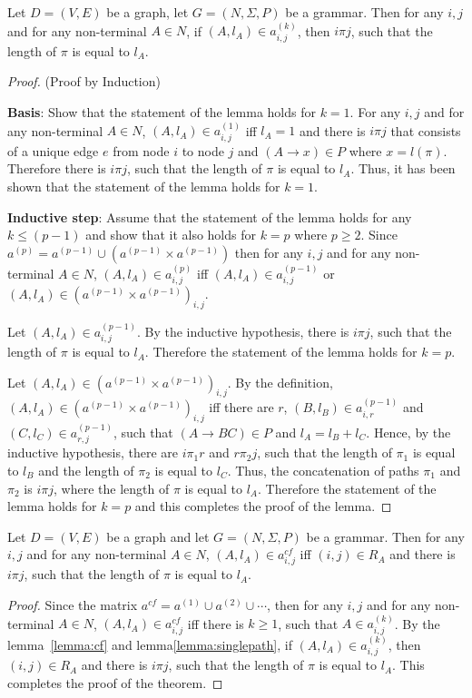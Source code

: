 \begin{lemma}\label{lemma:singlepath}
	Let $D = (V,E)$ be a graph, let $G =(N,\Sigma,P)$ be a grammar. Then for any $i, j$ and for any non-terminal $A \in N$, if $(A,l_A) \in a^{(k)}_{i,j}$, then $i \pi j$, such that the length of $\pi$ is equal to $l_A$.
\end{lemma}
\begin{proof}(Proof by Induction)
	
	\textbf{Basis}: Show that the statement of the lemma holds for $k = 1$. For any $i, j$ and for any non-terminal $A \in N$, $(A, l_A) \in a^{(1)}_{i,j}$ iff $l_A = 1$ and there is $i \pi j$ that consists of a unique edge $e$ from node $i$ to node $j$ and $(A \rightarrow x) \in P$ where $x = l(\pi)$. Therefore there is $i \pi j$, such that the length of $\pi$ is equal to $l_A$. Thus, it has been shown that the statement of the lemma holds for $k = 1$.
	
	\textbf{Inductive step}: Assume that the statement of the lemma holds for any $k \leq (p - 1)$ and show that it also holds for $k = p$ where $p \geq 2$. Since $a^{(p)} = a^{(p-1)} \cup (a^{(p-1)} \times a^{(p-1)})$ then for any $i, j$ and for any non-terminal $A \in N$, $(A, l_A) \in a^{(p)}_{i,j}$ iff $(A, l_A) \in a^{(p-1)}_{i,j}$ or $(A, l_A) \in (a^{(p-1)} \times a^{(p-1)})_{i,j}$.
	
	Let $(A, l_A) \in a^{(p-1)}_{i,j}$. By the inductive hypothesis, there is $i \pi j$, such that the length of $\pi$ is equal to $l_A$. Therefore the statement of the lemma holds for $k = p$.
	
	Let $(A, l_A) \in (a^{(p-1)} \times a^{(p-1)})_{i,j}$. By the definition, $(A, l_A) \in (a^{(p-1)} \times a^{(p-1)})_{i,j}$ iff there are $r$, $(B, l_B) \in a^{(p-1)}_{i,r}$ and $(C, l_C) \in a^{(p-1)}_{r,j}$, such that $(A \rightarrow B C) \in P$ and $l_A = l_B + l_C$. Hence, by the inductive hypothesis, there are $i \pi_1 r$ and $r \pi_2 j$, such that the length of $\pi_1$ is equal to $l_B$ and the length of $\pi_2$ is equal to $l_C$. Thus, the concatenation of paths $\pi_1$ and $\pi_2$ is $i \pi j$, where the length of $\pi$ is equal to $l_A$. Therefore the statement of the lemma holds for $k = p$ and this completes the proof of the lemma.
\end{proof}

\begin{mytheorem}\label{thm:singlepathcorrect}
	Let $D = (V,E)$ be a graph and let $G =(N,\Sigma,P)$ be a grammar. Then for any $i, j$ and for any non-terminal $A \in N$, $(A, l_A) \in a^{cf}_{i,j}$ iff $(i,j) \in R_A$ and there is $i \pi j$, such that the length of $\pi$ is equal to $l_A$.
\end{mytheorem}
\begin{proof}
	
	Since the matrix $a^{cf} = a^{(1)} \cup a^{(2)} \cup \cdots$, then for any $i, j$ and for any non-terminal $A \in N$, $(A, l_A) \in a^{cf}_{i,j}$ iff there is $k \geq 1$, such that $A \in a^{(k)}_{i,j}$. By the lemma~\ref{lemma:cf} and lemma\ref{lemma:singlepath}, if $(A, l_A) \in a^{(k)}_{i,j}$, then $(i,j) \in R_A$ and there is $i \pi j$, such that the length of $\pi$ is equal to $l_A$. This completes the proof of the theorem.
\end{proof}

